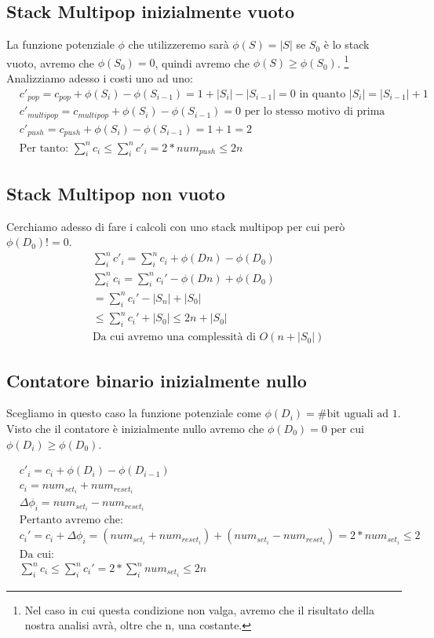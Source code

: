 \subsection{Stack Multipop inizialmente vuoto}
La funzione potenziale $\phi$ che utilizzeremo sarà $\phi(S) = |S|$ se $S_0$ è lo stack vuoto, avremo che $\phi(S_0) = 0$, quindi avremo che $\phi(S) \geq \phi(S_0)$. \footnote{Nel caso in cui questa condizione non valga, avremo che il risultato della nostra analisi avrà, oltre che n, una costante.} Analizziamo adesso i costi uno ad uno:
\begin{align*}
    &c'_{pop}= c_{pop} + \phi(S_i) - \phi(S_{i-1}) = 1+|S_i| - |S_{i-1}| = 0 \text{ in quanto } |S_i| = |S_{i-1}|+1\\
    &c'_{multipop} = c_{multipop} + \phi(S_i) - \phi(S_{i-1}) = 0 \text{ per lo stesso motivo di prima}\\
    &c'_{push} = c_{push} + \phi(S_i) - \phi(S_{i-1}) = 1+1=2\\
    &\text{Per tanto: } \sum_i^nc_i\leq \sum_i^nc'_i=2*num_{push}\leq 2n
\end{align*}

\subsection{Stack Multipop non vuoto}
Cerchiamo adesso di fare i calcoli con uno stack multipop per cui però $\phi(D_0)!=0$.
\begin{align*}
    &\sum_i^nc'_i = \sum_i^nc_i+\phi(Dn)-\phi(D_0)\\
    &\sum_i^nc_i = \sum_i^nc_i' - \phi(Dn)+\phi(D_0)\\
    &= \sum_i^nc_i' - |S_n| + |S_0| \\
    &\leq \sum_i^nc_i'+|S_0| \leq 2n+ |S_0|\\
    &\text{Da cui avremo una complessità di $O(n+|S_0|)$}
\end{align*}

\subsection{Contatore binario inizialmente nullo}
Scegliamo in questo caso la funzione potenziale come $\phi(D_i) = \text{\# bit uguali ad 1}$. Visto che il contatore è inizialmente nullo avremo che $\phi(D_0) = 0$ per cui $\phi(D_i) \geq \phi(D_0)$.

\begin{align*}
    &c'_i = c_i + \phi(D_i) - \phi(D_{i-1})\\
    &c_i = num_{set_i} + num_{reset_i} \\
    &\Delta\phi_i = num_{set_i} - num_{reset_i}\\
    &\text{Pertanto avremo che:}\\
    &c_i' = c_i + \Delta\phi_i = (num_{set_i} + num_{reset_i}) + (num_{set_i} - num_{reset_i}) = 2*num_{set_i} \leq 2\\
    &\text{Da cui:}\\
    &\sum_i^nc_i \leq \sum_i^n c_i' = 2* \sum_i^n num_{set_i} \leq 2n
\end{align*}

